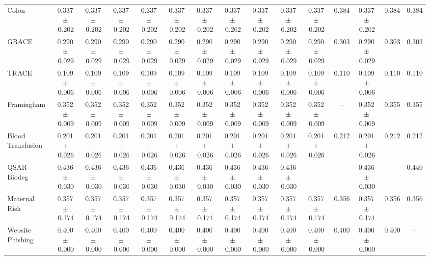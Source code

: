 \documentclass[8pt]{extarticle}
\begin{document}
\begin{longtable}{l*{14}{c}}
Colon & 0.337\,$\pm$\,0.202 & 0.337\,$\pm$\,0.202 & 0.337\,$\pm$\,0.202 & 0.337\,$\pm$\,0.202 & 0.337\,$\pm$\,0.202 & 0.337\,$\pm$\,0.202 & 0.337\,$\pm$\,0.202 & 0.337\,$\pm$\,0.202 & 0.337\,$\pm$\,0.202 & 0.337\,$\pm$\,0.202 & 0.384 & 0.337\,$\pm$\,0.202 & 0.384 & 0.384 \\
GRACE & 0.290\,$\pm$\,0.029 & 0.290\,$\pm$\,0.029 & 0.290\,$\pm$\,0.029 & 0.290\,$\pm$\,0.029 & 0.290\,$\pm$\,0.029 & 0.290\,$\pm$\,0.029 & 0.290\,$\pm$\,0.029 & 0.290\,$\pm$\,0.029 & 0.290\,$\pm$\,0.029 & 0.290\,$\pm$\,0.029 & 0.303 & 0.290\,$\pm$\,0.029 & 0.303 & 0.303 \\
TRACE & 0.109\,$\pm$\,0.006 & 0.109\,$\pm$\,0.006 & 0.109\,$\pm$\,0.006 & 0.109\,$\pm$\,0.006 & 0.109\,$\pm$\,0.006 & 0.109\,$\pm$\,0.006 & 0.109\,$\pm$\,0.006 & 0.109\,$\pm$\,0.006 & 0.109\,$\pm$\,0.006 & 0.109\,$\pm$\,0.006 & 0.110 & 0.109\,$\pm$\,0.006 & 0.110 & 0.110 \\
Framingham & 0.352\,$\pm$\,0.009 & 0.352\,$\pm$\,0.009 & 0.352\,$\pm$\,0.009 & 0.352\,$\pm$\,0.009 & 0.352\,$\pm$\,0.009 & 0.352\,$\pm$\,0.009 & 0.352\,$\pm$\,0.009 & 0.352\,$\pm$\,0.009 & 0.352\,$\pm$\,0.009 & 0.352\,$\pm$\,0.009 & -- & 0.352\,$\pm$\,0.009 & 0.355 & 0.355 \\
Blood Transfusion & 0.201\,$\pm$\,0.026 & 0.201\,$\pm$\,0.026 & 0.201\,$\pm$\,0.026 & 0.201\,$\pm$\,0.026 & 0.201\,$\pm$\,0.026 & 0.201\,$\pm$\,0.026 & 0.201\,$\pm$\,0.026 & 0.201\,$\pm$\,0.026 & 0.201\,$\pm$\,0.026 & 0.201\,$\pm$\,0.026 & 0.212 & 0.201\,$\pm$\,0.026 & 0.212 & 0.212 \\
QSAR Biodeg & 0.436\,$\pm$\,0.030 & 0.436\,$\pm$\,0.030 & 0.436\,$\pm$\,0.030 & 0.436\,$\pm$\,0.030 & 0.436\,$\pm$\,0.030 & 0.436\,$\pm$\,0.030 & 0.436\,$\pm$\,0.030 & 0.436\,$\pm$\,0.030 & 0.436\,$\pm$\,0.030 & -- & -- & 0.436\,$\pm$\,0.030 & -- & 0.440 \\
Maternal Risk & 0.357\,$\pm$\,0.174 & 0.357\,$\pm$\,0.174 & 0.357\,$\pm$\,0.174 & 0.357\,$\pm$\,0.174 & 0.357\,$\pm$\,0.174 & 0.357\,$\pm$\,0.174 & 0.357\,$\pm$\,0.174 & 0.357\,$\pm$\,0.174 & 0.357\,$\pm$\,0.174 & 0.357\,$\pm$\,0.174 & 0.356 & 0.357\,$\pm$\,0.174 & 0.356 & 0.356 \\
Website Phishing & 0.400\,$\pm$\,0.000 & 0.400\,$\pm$\,0.000 & 0.400\,$\pm$\,0.000 & 0.400\,$\pm$\,0.000 & 0.400\,$\pm$\,0.000 & 0.400\,$\pm$\,0.000 & 0.400\,$\pm$\,0.000 & 0.400\,$\pm$\,0.000 & 0.400\,$\pm$\,0.000 & 0.400\,$\pm$\,0.000 & 0.400 & 0.400\,$\pm$\,0.000 & 0.400 & -- \\
\end{longtable}
\end{document}

